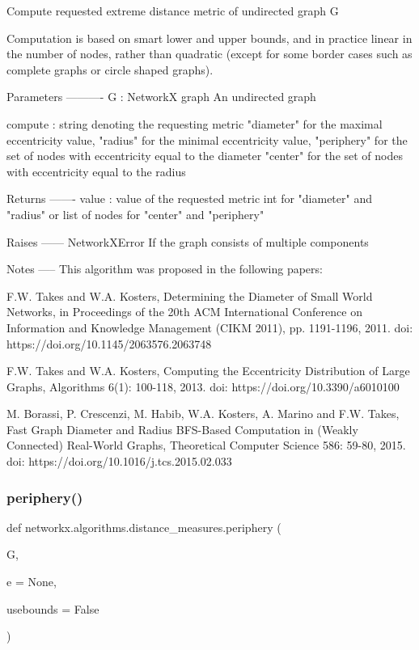 \begin{DoxyVerb}Compute requested extreme distance metric of undirected graph G

Computation is based on smart lower and upper bounds, and in practice
linear in the number of nodes, rather than quadratic (except for some
border cases such as complete graphs or circle shaped graphs).

Parameters
----------
G : NetworkX graph
   An undirected graph

compute : string denoting the requesting metric
   "diameter" for the maximal eccentricity value,
   "radius" for the minimal eccentricity value,
   "periphery" for the set of nodes with eccentricity equal to the diameter
   "center" for the set of nodes with eccentricity equal to the radius

Returns
-------
value : value of the requested metric
   int for "diameter" and "radius" or
   list of nodes for "center" and "periphery"

Raises
------
NetworkXError
    If the graph consists of multiple components

Notes
-----
This algorithm was proposed in the following papers:

F.W. Takes and W.A. Kosters, Determining the Diameter of Small World
Networks, in Proceedings of the 20th ACM International Conference on
Information and Knowledge Management (CIKM 2011), pp. 1191-1196, 2011.
doi: https://doi.org/10.1145/2063576.2063748

F.W. Takes and W.A. Kosters, Computing the Eccentricity Distribution of
Large Graphs, Algorithms 6(1): 100-118, 2013.
doi: https://doi.org/10.3390/a6010100

M. Borassi, P. Crescenzi, M. Habib, W.A. Kosters, A. Marino and F.W. Takes,
Fast Graph Diameter and Radius BFS-Based Computation in (Weakly Connected)
Real-World Graphs, Theoretical Computer Science 586: 59-80, 2015.
doi: https://doi.org/10.1016/j.tcs.2015.02.033
\end{DoxyVerb}
 \mbox{\label{namespacenetworkx_1_1algorithms_1_1distance__measures_a83a03687f3376c56cb956839a6e020df}} 
\subsubsection{\texorpdfstring{periphery()}{periphery()}}
{\footnotesize\ttfamily def networkx.\+algorithms.\+distance\+\_\+measures.\+periphery (\begin{DoxyParamCaption}\item[{}]{G,  }\item[{}]{e = {\ttfamily None},  }\item[{}]{usebounds = {\ttfamily False} }\end{DoxyParamCaption})}

